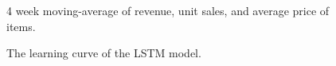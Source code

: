 \begin{figure}
    \centering
    \caption{4 week moving-average of revenue, unit sales, and average price of items.}
    \label{fig:ma_4week}
\end{figure}


\begin{figure}
    \centering
    \caption{The learning curve of the LSTM model.}
    \label{fig:lstm_curve}
\end{figure}


